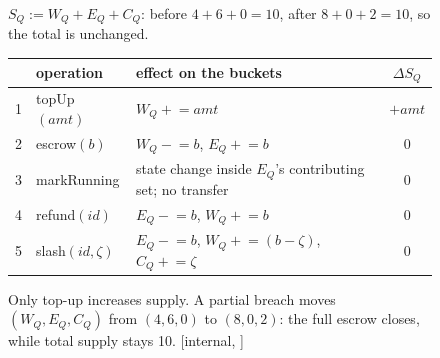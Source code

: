 \begin{figure}[H]
\medskip
{\footnotesize\centering
$S_Q := W_Q + E_Q + C_Q$: before $4+6+0=10$, after $8+0+2=10$, so the total is unchanged.
\par}

\medskip
{\footnotesize
\begin{tabularx}{\linewidth}{@{}c l >{\raggedright\arraybackslash}X c@{}}
\toprule
 & operation & effect on the buckets & $\Delta S_Q$ \\
\midrule
1 & topUp$(\mathit{amt})$ & $W_Q \mathrel{+}= \mathit{amt}$ & $+\mathit{amt}$ \\
2 & escrow$(b)$ & $W_Q \mathrel{-}= b$, $E_Q \mathrel{+}= b$ & $0$ \\
3 & markRunning & state change inside $E_Q$'s contributing set; no transfer & $0$ \\
4 & refund$(\mathit{id})$ & $E_Q \mathrel{-}= b$, $W_Q \mathrel{+}= b$ & $0$ \\
5 & slash$(\mathit{id},\zeta)$ & $E_Q \mathrel{-}= b$, $W_Q \mathrel{+}= (b{-}\zeta)$, $C_Q \mathrel{+}= \zeta$ & $0$ \\
\bottomrule
\end{tabularx}}
\caption{Only top-up increases supply. A partial breach moves $(W_Q,E_Q,C_Q)$ from $(4,6,0)$ to $(8,0,2)$: the full escrow closes, while total supply stays 10. [internal, \protect{}]}
\label{fig:bonded-conservation-ledger}
\end{figure}
